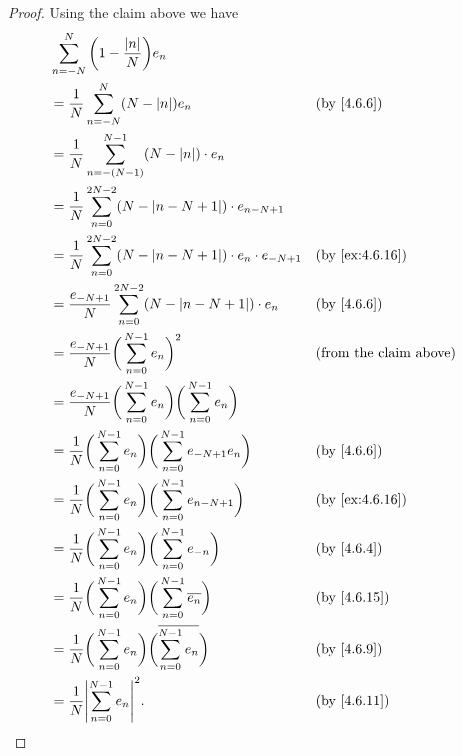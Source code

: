 \begin{proof}
  Using the claim above we have
  \begin{align*}
     & \sum_{n = -N}^N \bigg(1 - \dfrac{\abs{n}}{N}\bigg) e_n                                                                                 \\
     & = \dfrac{1}{N} \sum_{n = -N}^N (N - \abs{n}) e_n                                                    &  & \by{4.6.6}                    \\
     & = \dfrac{1}{N} \sum_{n = -(N - 1)}^{N - 1} (N - \abs{n}) \cdot e_n                                                                     \\
     & = \dfrac{1}{N} \sum_{n = 0}^{2N - 2} (N - \abs{n - N + 1}) \cdot e_{n - N + 1}                                                         \\
     & = \dfrac{1}{N} \sum_{n = 0}^{2N - 2} (N - \abs{n - N + 1}) \cdot e_n \cdot e_{-N + 1}               &  & \text{(by \cref{ex:4.6.16})}  \\
     & = \dfrac{e_{-N + 1}}{N} \sum_{n = 0}^{2N - 2} (N - \abs{n - N + 1}) \cdot e_n                       &  & \by{4.6.6}                    \\
     & = \dfrac{e_{-N + 1}}{N} \bigg(\sum_{n = 0}^{N - 1} e_n\bigg)^2                                      &  & \text{(from the claim above)} \\
     & = \dfrac{e_{-N + 1}}{N} \bigg(\sum_{n = 0}^{N - 1} e_n\bigg) \bigg(\sum_{n = 0}^{N - 1} e_n\bigg)                                      \\
     & = \dfrac{1}{N} \bigg(\sum_{n = 0}^{N - 1} e_n\bigg) \bigg(\sum_{n = 0}^{N - 1} e_{-N + 1} e_n\bigg) &  & \by{4.6.6}                    \\
     & = \dfrac{1}{N} \bigg(\sum_{n = 0}^{N - 1} e_n\bigg) \bigg(\sum_{n = 0}^{N - 1} e_{n - N + 1}\bigg)  &  & \text{(by \cref{ex:4.6.16})}  \\
     & = \dfrac{1}{N} \bigg(\sum_{n = 0}^{N - 1} e_n\bigg) \bigg(\sum_{n = 0}^{N - 1} e_{-n}\bigg)         &  & \by{4.6.4}                    \\
     & = \dfrac{1}{N} \bigg(\sum_{n = 0}^{N - 1} e_n\bigg) \bigg(\sum_{n = 0}^{N - 1} \overline{e_n}\bigg) &  & \text{(by \cref{4.6.15})}     \\
     & = \dfrac{1}{N} \bigg(\sum_{n = 0}^{N - 1} e_n\bigg) \bigg(\overline{\sum_{n = 0}^{N - 1} e_n}\bigg) &  & \by{4.6.9}                    \\
     & = \dfrac{1}{N} \abs{\sum_{n = 0}^{N - 1} e_n}^2.                                                    &  & \text{(by \cref{4.6.11})}
  \end{align*}
\end{proof}

